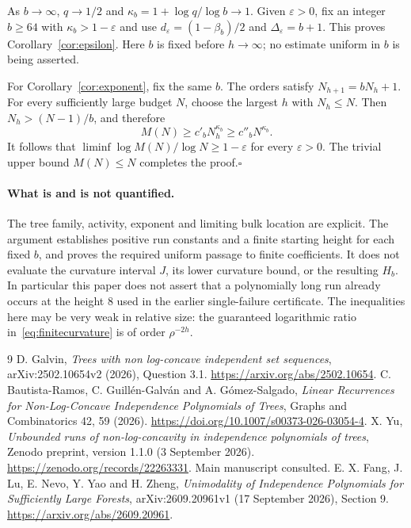 \documentclass[11pt]{article}
\begin{document}
As $b\to\infty$, $q\to1/2$ and
$\kappa_b=1+\log q/\log b\to1$. Given $\varepsilon>0$, fix an integer
$b\ge64$ with $\kappa_b>1-\varepsilon$ and use
$d_\varepsilon=(1-\beta_b)/2$ and $\Delta_\varepsilon=b+1$.
This proves Corollary~\ref{cor:epsilon}. Here $b$ is fixed before
$h\to\infty$; no estimate uniform in $b$ is being asserted.

For Corollary~\ref{cor:exponent}, fix the same $b$. The orders satisfy
$N_{h+1}=bN_h+1$. For every sufficiently large budget $N$, choose the
largest $h$ with $N_h\le N$. Then $N_h>(N-1)/b$, and therefore
\[
 M(N)\ge c'_bN_h^{\kappa_b}
 \ge c''_bN^{\kappa_b}.
\]
It follows that $\liminf\log M(N)/\log N\ge1-\varepsilon$ for every
$\varepsilon>0$. The trivial upper bound $M(N)\le N$ completes the
proof.\hfill$\square$

\paragraph{What is and is not quantified.}
The tree family, activity, exponent and limiting bulk location are
explicit. The argument establishes positive run constants and a finite
starting height for each fixed $b$, and proves the required uniform
passage to finite coefficients. It does not evaluate the curvature
interval $J$, its lower curvature bound, or the resulting $H_b$.
In particular this paper does not assert that a polynomially long run
already occurs at the height $8$ used in the earlier single-failure
certificate. The inequalities here may be very weak in relative size:
the guaranteed logarithmic ratio in~\eqref{eq:finitecurvature} is of
order $\rho^{-2h}$.

\begin{thebibliography}{9}
 D. Galvin, \emph{Trees with non log-concave independent
set sequences}, arXiv:2502.10654v2 (2026), Question 3.1.
\url{https://arxiv.org/abs/2502.10654}.
 C. Bautista-Ramos, C. Guill\'en-Galv\'an and
A. G\'omez-Salgado, \emph{Linear Recurrences for Non-Log-Concave Independence
Polynomials of Trees}, Graphs and Combinatorics 42, 59 (2026).
\url{https://doi.org/10.1007/s00373-026-03054-4}.
 X. Yu, \emph{Unbounded runs of non-log-concavity in independence
polynomials of trees}, Zenodo preprint, version 1.1.0 (3 September 2026).
\url{https://zenodo.org/records/22263331}. Main manuscript consulted.
 E. X. Fang, J. Lu, E. Nevo, Y. Yao and H. Zheng,
\emph{Unimodality of Independence Polynomials for Sufficiently Large
Forests}, arXiv:2609.20961v1 (17 September 2026), Section 9.
\url{https://arxiv.org/abs/2609.20961}.
\end{thebibliography}
\end{document}
